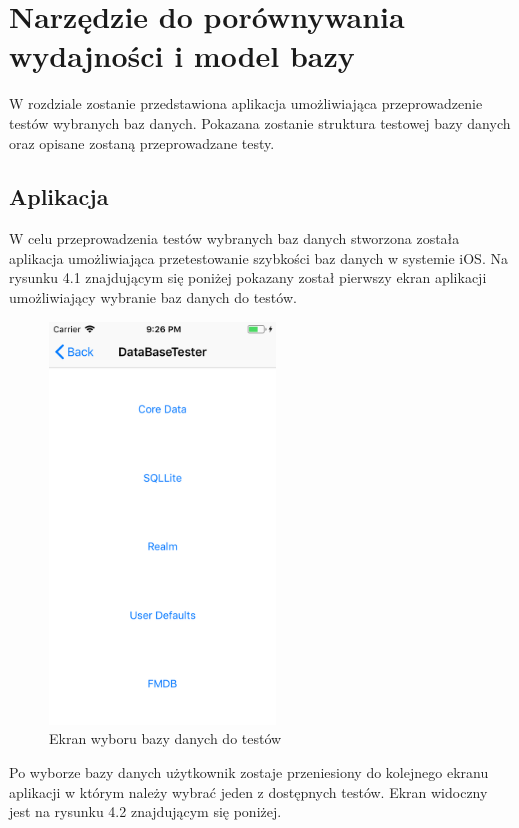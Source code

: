 \section{Narzędzie do porównywania wydajności i model bazy }

W rozdziale zostanie przedstawiona aplikacja umożliwiająca przeprowadzenie testów wybranych baz danych. Pokazana zostanie struktura testowej bazy danych oraz opisane zostaną przeprowadzane testy.

\subsection{Aplikacja}

W celu przeprowadzenia testów wybranych baz danych stworzona została aplikacja umożliwiająca przetestowanie szybkości baz danych w systemie iOS. Na rysunku 4.1 znajdującym się poniżej pokazany został pierwszy ekran aplikacji umożliwiający wybranie baz danych do testów. 

\begin{figure}[h]
\centering
	\includegraphics[width=6cm]{img/application/app-first-view.png}
	\caption{Ekran wyboru bazy danych do testów}
	\label{fig: first_app_view}
\end{figure}

Po wyborze bazy danych użytkownik zostaje przeniesiony do kolejnego ekranu aplikacji w którym należy wybrać jeden z dostępnych testów. Ekran widoczny jest na rysunku 4.2 znajdującym się poniżej.


